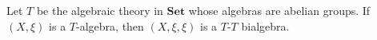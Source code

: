 Let $T$ be the algebraic theory in $\mathbf{Set}$ whose algebras are abelian groups. If $(X, \xi)$ is a $T$-algebra, then $(X, \xi, \xi)$ is a $T$-$T$ bialgebra.
